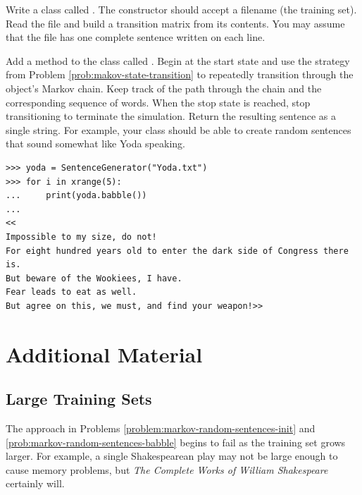 \begin{problem} %
Write a class called .
The constructor should accept a filename (the training set).
Read the file and build a transition matrix from its contents.
You may assume that the file has one complete sentence written on each line.
\label{problem:markov-random-sentences-init}
\end{problem}


\begin{problem} %
Add a method to the  class called .
Begin at the start state and use the strategy from Problem \ref{prob:makov-state-transition} to repeatedly transition through the object's Markov chain.
Keep track of the path through the chain and the corresponding sequence of words.
When the stop state is reached, stop transitioning to terminate the simulation.
Return the resulting sentence as a single string.
\newpage
For example, your  class should be able to create random sentences that sound somewhat like Yoda speaking.

\begin{lstlisting}
>>> yoda = SentenceGenerator("Yoda.txt")
>>> for i in xrange(5):
... 	print(yoda.babble())
...
<<
Impossible to my size, do not!
For eight hundred years old to enter the dark side of Congress there is.
But beware of the Wookiees, I have.
Fear leads to eat as well.
But agree on this, we must, and find your weapon!>>
\end{lstlisting}

\label{prob:markov-random-sentences-babble}
\end{problem}

\newpage

\section*{Additional Material} %

\subsection*{Large Training Sets} %

The approach in Problems \ref{problem:markov-random-sentences-init} and \ref{prob:markov-random-sentences-babble} begins to fail as the training set grows larger.
For example, a single Shakespearean play may not be large enough to cause memory problems, but \emph{The Complete Works of William Shakespeare} certainly will.

